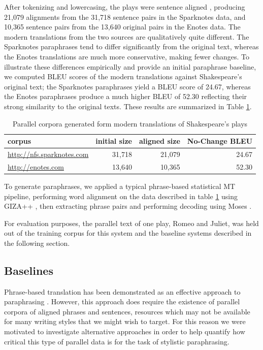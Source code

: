 \documentclass[10pt,a5paper,twoside]{article}
\begin{document}
After tokenizing and lowercasing, the plays were sentence aligned \cite{Moore02}, producing 21,079 alignments from the 31,718 sentence pairs in the Sparknotes data, and 10,365 sentence pairs from the 13,640 original 
pairs in the Enotes data.  The modern translations from the two sources are qualitatively quite
different.  The Sparknotes paraphrases tend to differ significantly from the original text, whereas the Enotes translations are much more conservative, making fewer changes.
To illustrate these differences empirically and provide an initial paraphrase baseline, we computed BLEU scores of the modern translations against Shakespeare's 
original text; the Sparknotes paraphrases yield a BLEU score of 24.67, whereas the Enotes paraphrases produce a much higher BLEU of 52.30 reflecting their strong similarity to the original texts.
These results are summarized in Table \ref{corpus_stats}.

\begin{table}
  \begin{center}
    \begin{tabular}{|l|r|r|r|}
      \hline
      corpus & initial size & aligned size & No-Change BLEU\\
      \hline
      \hline
      \url{http://nfs.sparknotes.com} & 31,718 & 21,079 & 24.67 \\
      \hline
      \url{http://enotes.com} & 13,640 & 10,365 & 52.30 \\
      \hline
    \end{tabular}
  \end{center}
  \caption{Parallel corpora generated form modern translations of Shakespeare's plays}
  \label{corpus_stats}
\end{table}

To generate paraphrases, we applied a typical phrase-based statistical MT pipeline, performing
word alignment on the data described in table \ref{corpus_stats} using GIZA++ \cite{Och03}, then extracting phrase pairs and performing decoding using Moses \cite{Koehn07}.

For evaluation purposes, the parallel text of one play, Romeo and Juliet, was held out of the training corpus for this system and the baseline systems described in the following section.

\subsection{Baselines}
Phrase-based translation has been demonstrated as an effective approach to paraphrasing \cite{quirk04,chen11}.  However, this approach does require the existence of
parallel corpora of aligned phrases and sentences, resources which may not be available for many writing styles that we might wish to target.  For this reason we were motivated to investigate alternative approaches in order to help
quantify how critical this type of parallel data is for the task of stylistic paraphrasing.
\end{document}
